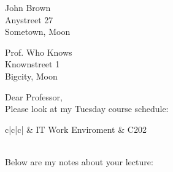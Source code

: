 \documentclass[11pt]{paper}
\begin{document}
\begin{flushright}
John Brown \\
Anystreet 27\\
Sometown, Moon
\end{flushright}

\begin{flushleft}
Prof. Who Knows
\\
Knownstreet 1
\\
Bigcity,  Moon
\bigskip

Dear Professor,
\\
Please look at my Tuesday course schedule:
\end{flushleft}

\begin{table}[!hb]
\begin{tabular}{c|c|c|}
\hline
{} & IT Work Enviroment & C202  \\
 \\
\hline
\end{tabular}
\end{table}

\begin{flushleft}
Below are my notes about your lecture:
\end{flushleft}
\end{document}
